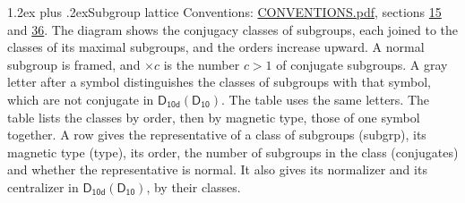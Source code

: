 \documentclass[10pt,a4paper]{article}
\makeatletter
\renewcommand\section{\@startsection{section}{1}{\z@}{-3ex plus -1ex minus -.2ex}%
  {1.2ex plus .2ex}{\normalfont\large\sffamily\bfseries\color{parttitle}}}
\numberwithin{equation}{section}
\newcommand{\grp}[1]{\mathsf{#1}}
\makeatother
\begin{document}
\section{Subgroup lattice}\label{s:subgroups}
Conventions: \href{../../CONVENTIONS.pdf}{CONVENTIONS.pdf}, sections \href{../../../rotation/CONVENTIONS.pdf\#conv.15}{15} and \href{../../CONVENTIONS.pdf\#conv.36}{36}.
The diagram shows the conjugacy classes of subgroups, each joined to the classes of its maximal subgroups, and the orders increase upward. \label{n:index.conjugates.c}\label{n:mark.conjugates}A normal subgroup is framed, and ${\times}c$ is the number $c > 1$ of conjugate subgroups. \label{n:mark.letter}A gray letter after a symbol distinguishes the classes of subgroups with that symbol, which are not conjugate in $\grp{D_{10d}}(\grp{D_{10}})$. The table uses the same letters. The table lists the classes by order, then by magnetic type, those of one symbol together. \label{n:head.subgroup}\label{n:head.magnetic.type}\label{n:head.order}\label{n:head.conjugates}\label{n:head.normal}A row gives the representative of a class of subgroups (subgrp), its magnetic type (type), its order, the number of subgroups in the class (conjugates) and whether the representative is normal. \label{n:head.normalizer}\label{n:head.centralizer}It also gives its normalizer and its centralizer in $\grp{D_{10d}}(\grp{D_{10}})$, by their classes. 
\end{document}
